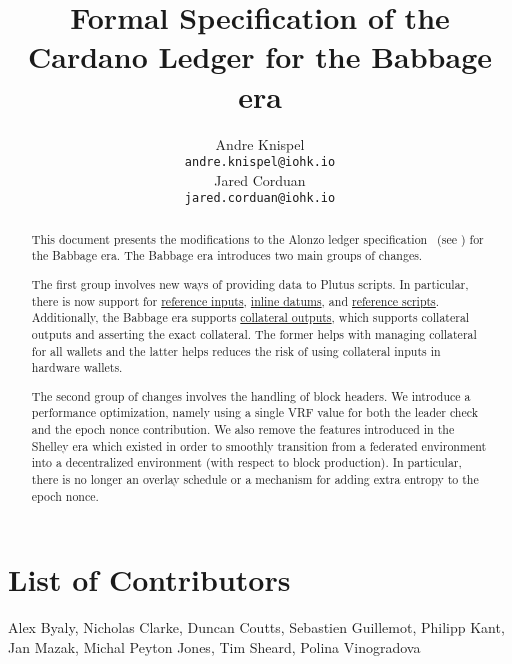 

\cleardoublepage
\renewcommand{\thepage}{\arabic{page}}
\setcounter{page}{1}

\title{Formal Specification of the Cardano Ledger for the Babbage era}

\author{
   Andre Knispel \\ {\small \texttt{andre.knispel@iohk.io}} \\
   Jared Corduan \\ {\small \texttt{jared.corduan@iohk.io}} \\
   }

\date{}

\maketitle

\begin{abstract}
This document presents the modifications to the Alonzo ledger specification~
(see \cite{alonzo_spec}) for the Babbage era.
The Babbage era introduces two main groups of changes.

The first group involves new ways of providing data to Plutus scripts.
In particular, there is now support for
\href{https://cips.cardano.org/cips/cip31/}{reference inputs},
\href{https://cips.cardano.org/cips/cip32/}{inline datums}, and
\href{https://cips.cardano.org/cips/cip33/}{reference scripts}.
Additionally, the Babbage era supports
\href{https://github.com/cardano-foundation/CIPs/pull/216}{collateral outputs},
which supports collateral outputs and asserting the exact collateral.
The former helps with managing collateral for all wallets and the latter helps
reduces the risk of using collateral inputs in hardware wallets.

The second group of changes involves the handling of block headers.
We introduce a performance optimization, namely using a single VRF value for both
the leader check and the epoch nonce contribution.
We also remove the features introduced in the Shelley era which existed in order
to smoothly transition from a federated environment into a decentralized environment
(with respect to block production).
In particular, there is no longer an overlay schedule or a mechanism for adding
extra entropy to the epoch nonce.
\end{abstract}

\section*{List of Contributors}
\label{acknowledgements}

Alex Byaly,
Nicholas Clarke,
Duncan Coutts,
Sebastien Guillemot,
Philipp Kant,
Jan Mazak,
Michal Peyton Jones,
Tim Sheard,
Polina Vinogradova

